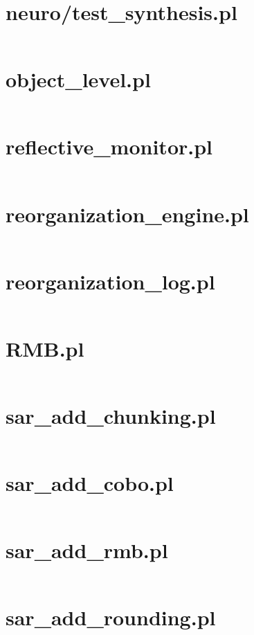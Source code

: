 \documentclass{article}
\begin{document}
\section{neuro/test\_synthesis.pl}
\inputminted{prolog}{neuro/test_synthesis.pl}

\section{object\_level.pl}
\inputminted{prolog}{object_level.pl}

\section{reflective\_monitor.pl}
\inputminted{prolog}{reflective_monitor.pl}

\section{reorganization\_engine.pl}
\inputminted{prolog}{reorganization_engine.pl}

\section{reorganization\_log.pl}
\inputminted{prolog}{reorganization_log.pl}

\section{RMB.pl}
\inputminted{prolog}{RMB.pl}

\section{sar\_add\_chunking.pl}
\inputminted{prolog}{sar_add_chunking.pl}

\section{sar\_add\_cobo.pl}
\inputminted{prolog}{sar_add_cobo.pl}

\section{sar\_add\_rmb.pl}
\inputminted{prolog}{sar_add_rmb.pl}

\section{sar\_add\_rounding.pl}
\inputminted{prolog}{sar_add_rounding.pl}
\end{document}
